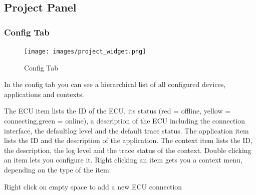 \documentclass[a4paper,11pt]{article}
\begin{document}
\subsection{Project Panel}

\subsubsection{Config Tab}


\begin{figure}[H]
 \centering
 \texttt{[image: images/project\_widget.png]}
 \caption{Config Tab}
 \label{fig:configtab}
\end{figure}


In the config tab you can see a hierarchical list of all configured devices, applications and contexts.

The ECU item lists the ID of the ECU, its status (red = offline, yellow = connecting,green = online), a description of the ECU including the connection interface, the defaultlog level and the default trace status.\linebreak
The application item lists the ID and the description of the application.\linebreak
The context item lists the ID, the description, the log level and the trace status of the context.
Double clicking an item lets you configure it. Right clicking an item gets you a context menu, depending on the type of the item:\linebreak

\vspace{0.3cm}

Right click on empty space to add a new ECU connection\linebreak
\end{document}
